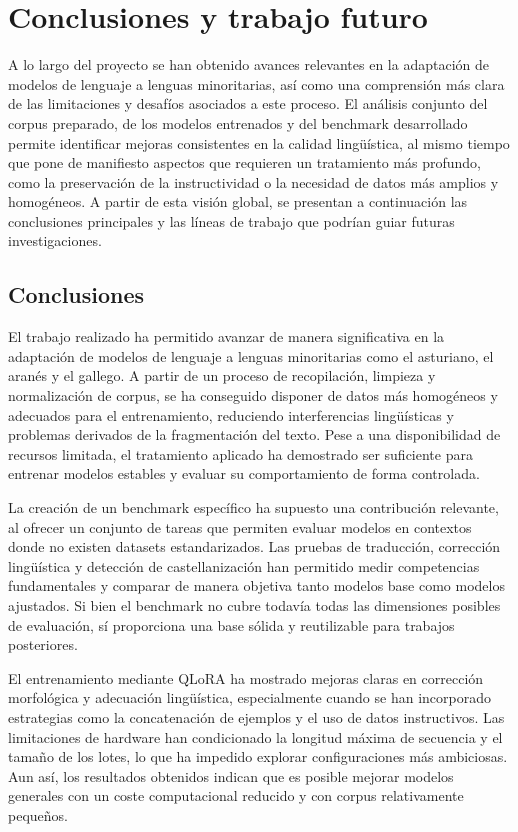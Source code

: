 \chapter{Conclusiones y trabajo futuro}
\label{ch:analisis}

A lo largo del proyecto se han obtenido avances relevantes en la adaptación de modelos de lenguaje a lenguas minoritarias, así como una comprensión más clara de las limitaciones y desafíos asociados a este proceso. El análisis conjunto del corpus preparado, de los modelos entrenados y del benchmark desarrollado permite identificar mejoras consistentes en la calidad lingüística, al mismo tiempo que pone de manifiesto aspectos que requieren un tratamiento más profundo, como la preservación de la instructividad o la necesidad de datos más amplios y homogéneos. A partir de esta visión global, se presentan a continuación las conclusiones principales y las líneas de trabajo que podrían guiar futuras investigaciones.

\section{Conclusiones}

El trabajo realizado ha permitido avanzar de manera significativa en la adaptación de modelos de lenguaje a lenguas minoritarias como el asturiano, el aranés y el gallego. A partir de un proceso de recopilación, limpieza y normalización de corpus, se ha conseguido disponer de datos más homogéneos y adecuados para el entrenamiento, reduciendo interferencias lingüísticas y problemas derivados de la fragmentación del texto. Pese a una disponibilidad de recursos limitada, el tratamiento aplicado ha demostrado ser suficiente para entrenar modelos estables y evaluar su comportamiento de forma controlada.

La creación de un benchmark específico ha supuesto una contribución relevante, al ofrecer un conjunto de tareas que permiten evaluar modelos en contextos donde no existen datasets estandarizados. Las pruebas de traducción, corrección lingüística y detección de castellanización han permitido medir competencias fundamentales y comparar de manera objetiva tanto modelos base como modelos ajustados. Si bien el benchmark no cubre todavía todas las dimensiones posibles de evaluación, sí proporciona una base sólida y reutilizable para trabajos posteriores.

El entrenamiento mediante QLoRA ha mostrado mejoras claras en corrección morfológica y adecuación lingüística, especialmente cuando se han incorporado estrategias como la concatenación de ejemplos y el uso de datos instructivos. Las limitaciones de hardware han condicionado la longitud máxima de secuencia y el tamaño de los lotes, lo que ha impedido explorar configuraciones más ambiciosas. Aun así, los resultados obtenidos indican que es posible mejorar modelos generales con un coste computacional reducido y con corpus relativamente pequeños.

